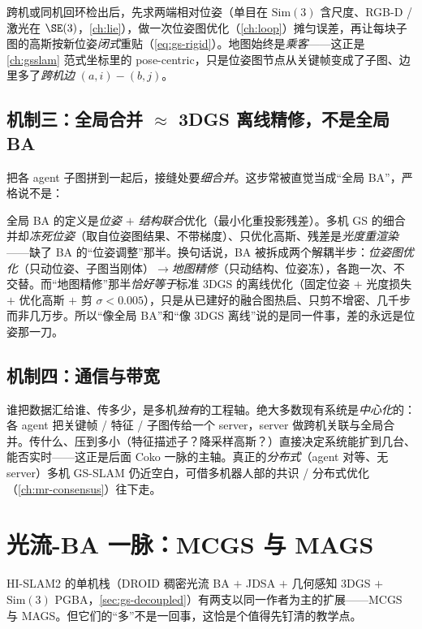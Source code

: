 跨机或同机回环检出后，先求两端相对位姿（单目在 $\mathrm{Sim}(3)$ 含尺度、RGB-D / 激光在 $\SE(3)$，\cref{ch:lie}），做一次位姿图优化（\cref{ch:loop}）摊匀误差，再让每块子图的高斯按新位姿\emph{闭式}重贴（\cref{eq:gs-rigid}）。地图始终是\emph{乘客}——这正是 \cref{ch:gsslam} 范式坐标里的 pose-centric，只是位姿图节点从关键帧变成了子图、边里多了\emph{跨机边} $(a,i)\!-\!(b,j)$。

\subsection{机制三：全局合并 $\approx$ 3DGS 离线精修，不是全局 BA}

把各 agent 子图拼到一起后，接缝处要\emph{细合并}。这步常被直觉当成“全局 BA”，严格说不是：

\begin{insight}
全局 BA 的定义是\emph{位姿 $+$ 结构联合}优化（最小化重投影残差）。多机 GS 的细合并却\emph{冻死位姿}（取自位姿图结果、不带梯度）、只优化高斯、残差是\emph{光度重渲染}——缺了 BA 的“位姿调整”那半。换句话说，BA 被拆成两个解耦半步：\emph{位姿图优化}（只动位姿、子图当刚体）$\to$\emph{地图精修}（只动结构、位姿冻），各跑一次、不交替。而“地图精修”那半\emph{恰好等于}标准 3DGS 的离线优化（固定位姿 $+$ 光度损失 $+$ 优化高斯 $+$ 剪 $\sigma\!<\!0.005$），只是从已建好的融合图热启、只剪不增密、几千步而非几万步。所以“像全局 BA”和“像 3DGS 离线”说的是同一件事，差的永远是位姿那一刀。
\end{insight}

\subsection{机制四：通信与带宽}

谁把数据汇给谁、传多少，是多机\emph{独有}的工程轴。绝大多数现有系统是\emph{中心化}的：各 agent 把关键帧 / 特征 / 子图传给一个 server，server 做跨机关联与全局合并。传什么、压到多小（特征描述子？降采样高斯？）直接决定系统能扩到几台、能否实时——这正是后面 Coko 一脉的主轴。真正的\emph{分布式}（agent 对等、无 server）多机 GS-SLAM 仍近空白，可借多机器人部的共识 / 分布式优化（\cref{ch:mr-consensus}）往下走。

\section{光流-BA 一脉：MCGS 与 MAGS}
\label{sec:mags-flowba}

HI-SLAM2 的单机栈（DROID 稠密光流 BA $+$ JDSA $+$ 几何感知 3DGS $+$ $\mathrm{Sim}(3)$ PGBA，\cref{sec:gs-decoupled}）有两支以同一作者为主的扩展——MCGS 与 MAGS。但它们的“多”不是一回事，这恰是个值得先钉清的教学点。

